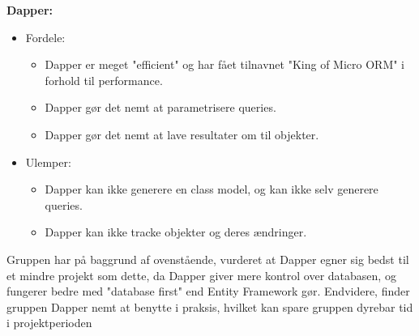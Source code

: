 \textbf{Dapper:}
\begin{itemize}
    \item Fordele:
    \begin{itemize}
        \item Dapper er meget "efficient" og har fået tilnavnet "King of Micro ORM" i forhold til performance.
        \item Dapper gør det nemt at parametrisere queries.
        \item Dapper gør det nemt at lave resultater om til objekter.
    \end{itemize}
    \item Ulemper:
    \begin{itemize}
        \item Dapper kan ikke generere en class model, og kan ikke selv generere queries.
        \item Dapper kan ikke tracke objekter og deres ændringer.
    \end{itemize}
\end{itemize}

Gruppen har på baggrund af ovenstående, vurderet at Dapper egner sig bedst til et mindre projekt som
dette, da Dapper giver mere kontrol over databasen, og fungerer bedre med "database first" end
Entity Framework gør. Endvidere, finder gruppen Dapper nemt at benytte i praksis, hvilket kan spare gruppen dyrebar
tid i projektperioden